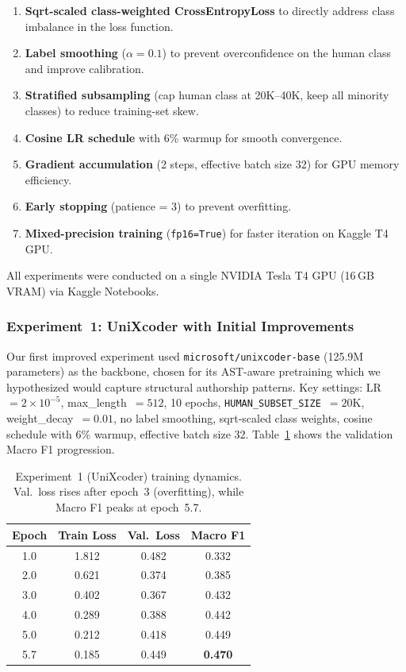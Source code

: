 \documentclass[11pt]{article}
\begin{document}
\begin{enumerate}
    \item \textbf{Sqrt-scaled class-weighted CrossEntropyLoss} to directly address class imbalance in the loss function.
    \vspace{7\baselineskip}
    \item \textbf{Label smoothing} ($\alpha = 0.1$) to prevent overconfidence on the human class and improve calibration.
    \item \textbf{Stratified subsampling} (cap human class at 20K--40K, keep all minority classes) to reduce training-set skew.
    \item \textbf{Cosine LR schedule} with 6\% warmup for smooth convergence.
    \item \textbf{Gradient accumulation} (2 steps, effective batch size 32) for GPU memory efficiency.
    \item \textbf{Early stopping} (patience = 3) to prevent overfitting.
    \item \textbf{Mixed-precision training} (\texttt{fp16=True}) for faster iteration on Kaggle T4 GPU.
\end{enumerate}

All experiments were conducted on a single NVIDIA Tesla T4 GPU (16\,GB VRAM) via Kaggle Notebooks.

\subsubsection{Experiment~1: UniXcoder with Initial Improvements}

Our first improved experiment used \texttt{microsoft/unixcoder-base} (125.9M parameters) as the backbone, chosen for its AST-aware pretraining which we hypothesized would capture structural authorship patterns.
Key settings: LR~$= 2{\times}10^{-5}$, max\_length~$= 512$, 10 epochs, \texttt{HUMAN\_SUBSET\_SIZE}~$= 20\text{K}$, weight\_decay~$= 0.01$, no label smoothing, sqrt-scaled class weights, cosine schedule with 6\% warmup, effective batch size 32.
Table~\ref{tab:taskB_exp1_progress} shows the validation Macro F1 progression.

\begin{table}[htbp]
\centering
\footnotesize
\begin{tabularx}{\columnwidth}{@{}c c c c@{}}
\toprule
\textbf{Epoch} & \textbf{Train Loss} & \textbf{Val.\ Loss} & \textbf{Macro F1} \\ \midrule
1.0 & 1.812 & 0.482 & 0.332 \\
2.0 & 0.621 & 0.374 & 0.385 \\
3.0 & 0.402 & 0.367 & 0.432 \\
4.0 & 0.289 & 0.388 & 0.442 \\
5.0 & 0.212 & 0.418 & 0.449 \\
5.7 & 0.185 & 0.449 & \textbf{0.470} \\
\bottomrule
\end{tabularx}
\caption{Experiment~1 (UniXcoder) training dynamics. Val.\ loss rises after epoch~3 (overfitting), while Macro F1 peaks at epoch~5.7.}
\label{tab:taskB_exp1_progress}
\end{table}
\end{document}
